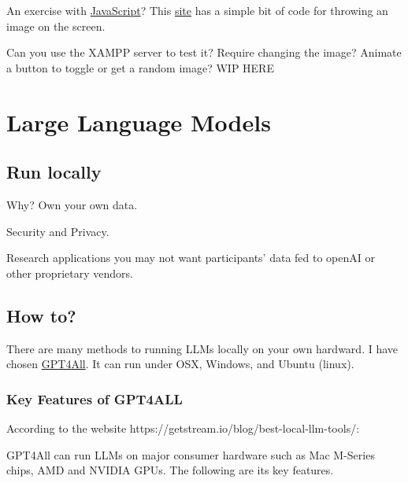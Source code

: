 \documentclass[
  letterpaper,
  DIV=11,
  numbers=noendperiod]{scrreprt}
\begin{document}
An exercise with
\href{https://code.visualstudio.com/Docs/languages/javascript}{JavaScript}?
This
\href{https://www.geeksforgeeks.org/how-to-display-images-in-javascript/}{site}
has a simple bit of code for throwing an image on the screen.

Can you use the XAMPP server to test it? Require changing the image?
Animate a button to toggle or get a random image? WIP HERE


\chapter{Large Language Models}\label{large-language-models}

\section{Run locally}\label{run-locally}

Why? Own your own data.

Security and Privacy.

Research applications you may not want participants' data fed to openAI
or other proprietary vendors.

\section{How to?}\label{how-to}

There are many methods to running LLMs locally on your own hardward. I
have chosen \href{https://www.nomic.ai/gpt4all}{GPT4All}. It can run
under OSX, Windows, and Ubuntu (linux).

\subsection{Key Features of GPT4ALL}\label{key-features-of-gpt4all}

According to the website
https://getstream.io/blog/best-local-llm-tools/:

GPT4All can run LLMs on major consumer hardware such as Mac M-Series
chips, AMD and NVIDIA GPUs. The following are its key features.
\end{document}
